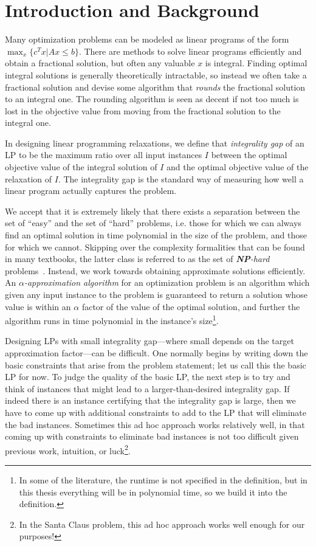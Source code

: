 \chapter{Introduction and Background}

Many optimization problems can be modeled as linear programs of the form $\max_x\{c^T x | Ax \leq b\}$.
There are methods to solve linear programs efficiently and obtain a fractional solution, 
but often any valuable $x$ is integral. 
Finding optimal integral solutions is generally theoretically intractable, 
so instead we often take a fractional solution and devise some algorithm that \emph{rounds} 
the fractional solution to an integral one. 
The rounding algorithm is seen as decent if not too much is lost in the objective value from moving from the fractional solution to the integral one.


In designing linear programming relaxations, we define that \emph{integrality gap} of an LP
to be the maximum ratio over all input instances $I$ between the optimal objective value of the integral solution of $I$ and the optimal objective value of 
the relaxation of $I$.
The integrality gap is the standard way of measuring 
how well a linear program actually captures the problem. 


We accept that it is extremely likely that there exists a separation 
between the set of ``easy'' and the set of ``hard'' problems, i.e. those for which we can always find an optimal solution in time polynomial in the 
size of the problem, and those for which we cannot. Skipping over the complexity formalities that can be found in many textbooks, the latter class is referred to as
the set of \emph{\textbf{NP}-hard} problems~\cite{sipser13}.
Instead, we work towards obtaining approximate solutions efficiently. 
An \emph{$\alpha$-approximation algorithm} for an optimization problem is
an algorithm which given any input instance to the problem is guaranteed to return a solution whose value is
within an $\alpha$ factor 
of the value of the optimal solution, and further  the algorithm runs in time polynomial in the instance's size\footnote{In some of the literature, 
the runtime is not specified in the definition, but in this thesis everything will be in polynomial time, so we build it into the definition.}.

Designing LPs with small integrality gap---where small depends on the target approximation factor---can be difficult. 
One normally begins by writing down the basic constraints that arise from the problem statement; let us call this the basic LP for now. 
To judge the quality of the basic LP, the next step is to try and think of instances that might lead to a larger-than-desired integrality gap.
If indeed there is an instance certifying that the integrality gap is large, then we have to come up 
with additional constraints to add to the LP that will eliminate the bad instances. 
Sometimes this ad hoc approach works relatively well, in that coming up with constraints to eliminate bad instances 
is not too difficult given previous work, intuition, or luck\footnote{In the Santa Claus problem, this ad hoc approach works well enough for our purposes!}.

